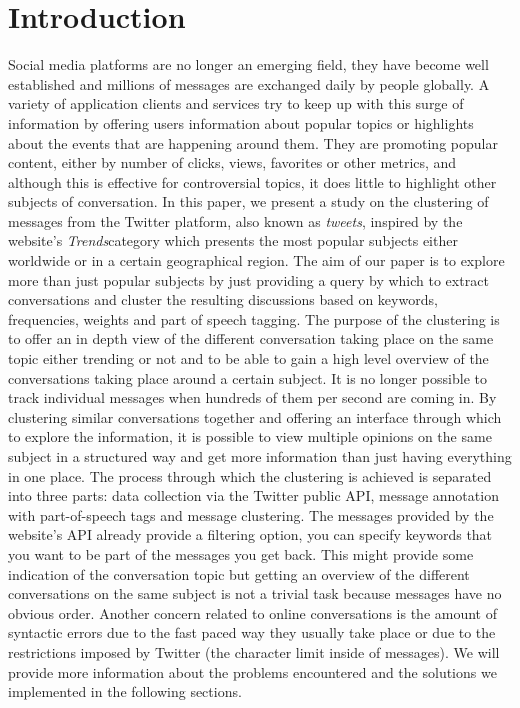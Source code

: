 \chapter{Introduction}
\label{chapter:intro}

Social media platforms are no longer an emerging field, they have become well established and millions of messages are exchanged daily by people globally. A variety of application clients and services try to keep up with this surge of information by offering users information about popular topics or highlights about the events that are happening around them. They are promoting popular content, either by number of clicks, views, favorites or other metrics, and although this is effective for controversial topics, it does little to highlight other subjects of conversation.
\newline
\newline
In this paper, we present a study on the clustering of messages from the Twitter platform, also known as \textit{tweets}, inspired by the website's \textit{Trends}category  which presents the most popular subjects either worldwide or in a certain geographical region. The aim of our paper is to explore more than just popular subjects by just providing a query by which to extract conversations and cluster the resulting discussions based on keywords, frequencies, weights and part of speech tagging. The purpose of the clustering is to offer an in depth view of the different conversation taking place on the same topic either trending or not and to be able to gain a high level overview of the conversations taking place around a certain subject.
\newline
\newline
It is no longer possible to track individual messages when hundreds of them per second are coming in. By clustering similar conversations together and offering an interface through which to explore the information, it is possible to view multiple opinions on the same subject in a structured way and get more information than just having everything in one place.
\newline
\newline
The process through which the clustering is achieved is separated into three parts: data collection via the Twitter public API, message annotation with part-of-speech tags and message clustering. The messages provided by the website's API already provide a filtering option, you can specify keywords that you want to be part of the messages you get back. This might provide some indication of the conversation topic but getting an overview of the different conversations on the same subject is not a trivial task because messages have no obvious order. Another concern related to online conversations is the amount of syntactic errors due to the fast paced way they usually take place or due to the restrictions imposed by Twitter (the character limit inside of messages).
\newline
\newline
We will provide more information about the problems encountered and the solutions we implemented in the following sections.

